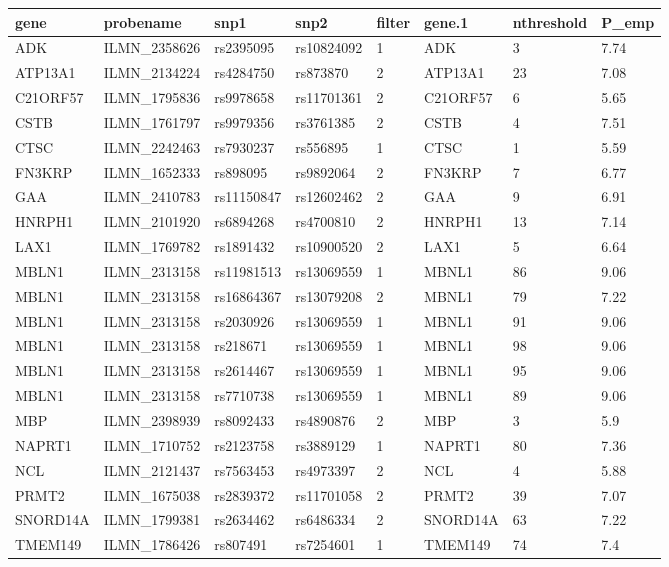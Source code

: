 \documentclass[paper=a4, fontsize=11pt]{scrartcl}         %
\numberwithin{equation}{section}                  %
\numberwithin{figure}{section}                    %
\numberwithin{table}{section}                   %
\begin{document}
\begin{table}[ht]
\centering
\begin{tabular}{llllllll}
  \hline
 gene & probename & snp1 & snp2 & filter & gene.1 & nthreshold & P\_emp \\ 
  \hline
ADK & ILMN\_2358626 & rs2395095 & rs10824092 & 1 & ADK & 3 & 7.74 \\ 
ATP13A1 & ILMN\_2134224 & rs4284750 & rs873870 & 2 & ATP13A1 & 23 & 7.08 \\ 
C21ORF57 & ILMN\_1795836 & rs9978658 & rs11701361 & 2 & C21ORF57 & 6 & 5.65 \\ 
CSTB & ILMN\_1761797 & rs9979356 & rs3761385 & 2 & CSTB & 4 & 7.51 \\ 
CTSC & ILMN\_2242463 & rs7930237 & rs556895 & 1 & CTSC & 1 & 5.59 \\ 
FN3KRP & ILMN\_1652333 & rs898095 & rs9892064 & 2 & FN3KRP & 7 & 6.77 \\ 
GAA & ILMN\_2410783 & rs11150847 & rs12602462 & 2 & GAA & 9 & 6.91 \\ 
HNRPH1 & ILMN\_2101920 & rs6894268 & rs4700810 & 2 & HNRPH1 & 13 & 7.14 \\ 
LAX1 & ILMN\_1769782 & rs1891432 & rs10900520 & 2 & LAX1 & 5 & 6.64 \\ 
MBLN1 & ILMN\_2313158 & rs11981513 & rs13069559 & 1 & MBNL1 & 86 & 9.06 \\ 
MBLN1 & ILMN\_2313158 & rs16864367 & rs13079208 & 2 & MBNL1 & 79 & 7.22 \\ 
MBLN1 & ILMN\_2313158 & rs2030926 & rs13069559 & 1 & MBNL1 & 91 & 9.06 \\ 
MBLN1 & ILMN\_2313158 & rs218671 & rs13069559 & 1 & MBNL1 & 98 & 9.06 \\ 
MBLN1 & ILMN\_2313158 & rs2614467 & rs13069559 & 1 & MBNL1 & 95 & 9.06 \\ 
MBLN1 & ILMN\_2313158 & rs7710738 & rs13069559 & 1 & MBNL1 & 89 & 9.06 \\ 
MBP & ILMN\_2398939 & rs8092433 & rs4890876 & 2 & MBP & 3 & 5.9 \\ 
NAPRT1 & ILMN\_1710752 & rs2123758 & rs3889129 & 1 & NAPRT1 & 80 & 7.36 \\ 
NCL & ILMN\_2121437 & rs7563453 & rs4973397 & 2 & NCL & 4 & 5.88 \\ 
PRMT2 & ILMN\_1675038 & rs2839372 & rs11701058 & 2 & PRMT2 & 39 & 7.07 \\ 
SNORD14A & ILMN\_1799381 & rs2634462 & rs6486334 & 2 & SNORD14A & 63 & 7.22 \\ 
TMEM149 & ILMN\_1786426 & rs807491 & rs7254601 & 1 & TMEM149 & 74 & 7.4 \\ 

\end{tabular}
\end{table}
\end{document}
